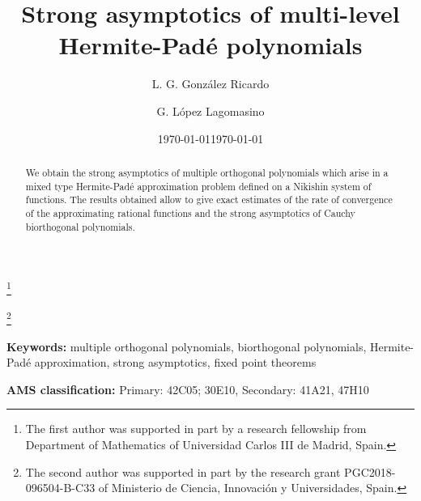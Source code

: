 \documentclass{amsart}
\date{\today}
\numberwithin{equation}{section}
\theoremstyle{definition}
\begin{document}
	
	
	\title[Strong asymptotics of polynomials]{Strong asymptotics of multi-level Hermite-Pad\'{e} polynomials}
	
	\author{L. G. Gonz\'alez Ricardo}
	\address{Department of Mathematics, Universidad Carlos \textsc{iii} de Madrid, Avenida de la Universidad, 30 CP-28911, Leganés, Madrid, Spain.}
	\thanks{The first author was supported in part by a research fellowship from Department of Mathematics of Universidad Carlos III de Madrid, Spain.}
	
	\author{G. L\'opez Lagomasino}
	\address{Department of Mathematics, Universidad Carlos \textsc{iii} de Madrid, Avenida de la Universidad, 30 CP-28911, Leganés, Madrid, Spain.}
	\thanks{The second author was supported in part by the research grant PGC2018-096504-B-C33 of Ministerio de Ciencia, Innovaci\'on y Universidades, Spain.}
	
	\date{\today}
	
	\begin{abstract}
		We obtain the strong asymptotics of multiple orthogonal polynomials which arise in a mixed type Hermite-Pad\'e approximation problem defined on a Nikishin system of functions.  The results obtained allow to give exact estimates of the rate of convergence of the approximating rational functions and the strong asymptotics of Cauchy biorthogonal
polynomials.
\end{abstract}
	
	
	
	\maketitle
	
	\medskip
	
	\noindent \textbf{Keywords:} multiple orthogonal polynomials, biorthogonal polynomials, Hermite-Pad\'e approximation, strong asymptotics, fixed point theorems
	
	\medskip
	
	\noindent \textbf{AMS classification:}  Primary: 42C05; 30E10,  Secondary: 41A21, 47H10
	
\end{document}

